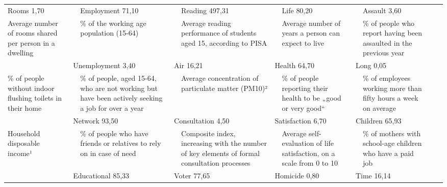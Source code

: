 \documentclass{article}
\newcommand{\tabitem}[1]{{\fontspec[Color=808080, Scale=1.1]{Lato Bold} #1}}
\newcommand{\tabzahl}[1]{{\fontspec[Color=808080, Scale=1.1]{Lato Bold} #1}}
\begin{document}
\pagestyle{empty}
\setlength{\tabcolsep}{0.35cm}
\footnotesize
 \begin{tabular}{p{4.3cm}p{0.1cm}p{4.3cm}p{0.1cm}p{4.3cm}p{0.1cm}p{4.3cm}p{0.1cm}p{4.3cm}p{0.1cm}p{0.1cm}}
\toprule
\multicolumn{2}{l}{ \tabitem{Rooms} \hfill \tabzahl{1,70}} & \multicolumn{2}{l}{\tabitem{Employment} \hfill \tabzahl{71,10}} & \multicolumn{2}{l}{\tabitem{Reading} \hfill \tabzahl{497,31}} & \multicolumn{2}{l}{\tabitem{Life} \hfill \tabzahl{80,20}} & \multicolumn{2}{l}{\tabitem{Assault} \hfill \tabzahl{3,60}}& 
\tabularnewline
\raggedright Average number of rooms shared per person in a dwelling &  & \% of the working age population (15-64) &  & \raggedright Average reading performance of students aged 15, according to PISA &  & \raggedright Average number of years a person can expect to live &  & \raggedright \% of people who report having been assaulted in the previous year& 
\tabularnewline
\addlinespace
\multicolumn{2}{l}{\tabitem{Dwelling} \hfill \tabzahl{1,20}} & \multicolumn{2}{l}{\tabitem{Unemployment} \hfill \tabzahl{3,40}} & \multicolumn{2}{l}{\tabitem{Air} \hfill \tabzahl{16,21}} & \multicolumn{2}{l}{\tabitem{Health} \hfill \tabzahl{64,70}} & \multicolumn{2}{l}{\tabitem{Long} \hfill \tabzahl{0,05}}& 
\tabularnewline
\raggedright \% of people without indoor flushing toilets in their home &  & \raggedright \% of people, aged 15-64, who are not working but have been actively seeking a job for over a year &  &  \raggedright Average concentration of particulate matter (PM10)² &  & \raggedright \% of people reporting their health to be „good or very good“ &  & \raggedright \% of employees working more than fifty hours a week on average& 
\tabularnewline
\addlinespace
\multicolumn{2}{l}{\tabitem{Income} \hfill \tabzahl{27664,72}} & \multicolumn{2}{l}{\tabitem{Network} \hfill \tabzahl{93,50}} & \multicolumn{2}{l}{\tabitem{Consultation} \hfill \tabzahl{4,50}} & \multicolumn{2}{l}{\tabitem{Satisfaction} \hfill \tabzahl{6,70}} & \multicolumn{2}{l}{\tabitem{Children} \hfill \tabzahl{65,93}}& 
\tabularnewline
\raggedright Household disposable income¹  & & \raggedright \% of people who have friends or relatives to rely on in case of need &  & \raggedright Composite index, increasing with the number of key elements of formal consultation processes &  & \raggedright Average self-evaluation of life satisfaction, on a scale from 0 to 10 &  & \raggedright \% of mothers with school-age children who have a paid job& 
\tabularnewline
\addlinespace
\multicolumn{2}{l}{\tabitem{Wealth} \hfill \tabzahl{45113,30}} & \multicolumn{2}{l}{\tabitem{Educational} \hfill \tabzahl{85,33}} & \multicolumn{2}{l}{\tabitem{Voter} \hfill \tabzahl{77,65}} & \multicolumn{2}{l}{\tabitem{Homicide} \hfill \tabzahl{0,80}} & \multicolumn{2}{l}{\tabitem{Time} \hfill \tabzahl{16,14}}& 

\end{tabular}
\end{document}
